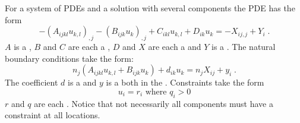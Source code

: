 For a system of PDEs and a solution with several components the PDE has the form
\begin{equation}\label{LINEARPDE.SYSTEM.1}
-(A_{ijkl} u_{k,l})_{,j}-(B_{ijk} u_{k})_{,j}+C_{ikl} u_{k,l}+D_{ik} u_{k} =-X_{ij,j}+Y_{i} \; .
\end{equation}
$A$ is a \RankFour, $B$ and $C$ are each a \RankThree, $D$ and $X$ are each a \RankTwo and $Y$ is a \RankOne.
The natural boundary conditions  take the form:
\begin{equation}\label{LINEARPDE.SYSTEM.2}
n_{j}(A_{ijkl} u_{k,l}+B_{ijk} u_{k})+d_{ik} u_{k}=n_{j}X_{ij}+y_{i}  \;.
\end{equation}
The coefficient $d$ is a \RankTwo and $y$ is a
\RankOne both in the \FunctionOnBoundary. Constraints  take the form
\begin{equation}\label{LINEARPDE.SYSTEM.3}
u_{i}=r_{i} \mbox{ where } q_{i}>0
\end{equation}
$r$ and $q$ are each \RankOne. Notice that not necessarily all components must
have a constraint at all locations.

